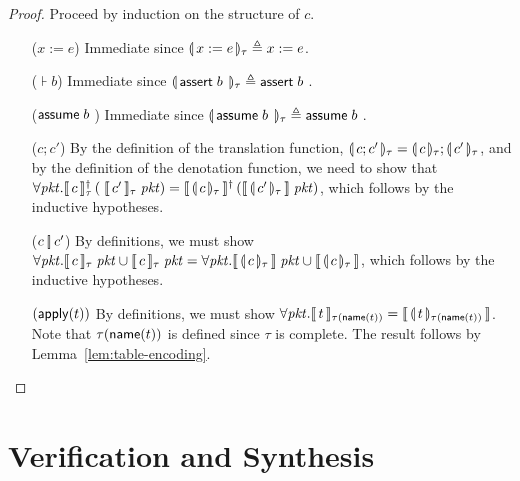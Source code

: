 \begin{proof}

  Proceed by induction on the structure of $c$.
  \begin{enumerate}[align=left]
  \item[($x:=e$)] Immediate since $\llparenthesis\, x:=e\, \rrparenthesis_{\tau} \triangleq x := e$.
  \item[($\assert b$)] Immediate since
    $\llparenthesis\, \mathsf{assert}\; b\;\, \rrparenthesis_{\tau} \triangleq \mathsf{assert}\; b\;$.
  \item[($\mathsf{assume}\; b\;$)] Immediate since $\llparenthesis\, \mathsf{assume}\; b\;\, \rrparenthesis_{\tau} \triangleq \mathsf{assume}\; b\;$.
  \item[($c;c'$)] By the definition of the translation function,
    $\llparenthesis\, c;c'\, \rrparenthesis_{\tau} = \llparenthesis\, c\, \rrparenthesis_{\tau};\llparenthesis\, c'\, \rrparenthesis_{\tau}$,
    and by the definition of the denotation function, we need to show
    that
    $\forall
    \mathit{pkt}. \llbracket\,c\,\rrbracket_\tau^\dag\left(\;\llbracket\,c'\,\rrbracket_\tau\;\mathit{pkt}\right) =
    \llbracket\,\llparenthesis\, c\, \rrparenthesis_\tau\,\rrbracket^\dag\left(\llbracket\,\llparenthesis\, c'\, \rrparenthesis_\tau\,\rrbracket\;\mathit{pkt}\right)$,
  which follows by the inductive hypotheses.
  \item[($c \operatorname*{\left[\!\right]} c'$)] By definitions, we must show
    $\forall \mathit{pkt}. \llbracket\,c\,\rrbracket_\tau\; \mathit{pkt} \cup \llbracket\,c\,\rrbracket_\tau\;
    \mathit{pkt} = \forall \mathit{pkt}. \llbracket\,\llparenthesis\, c\, \rrparenthesis_\tau\,\rrbracket\; \mathit{pkt} \cup
    \llbracket\,\llparenthesis\, c\, \rrparenthesis_\tau\,\rrbracket$, which follows by the inductive
    hypotheses.
  \item[$(\mathsf{apply}(t))$] By definitions, we must show
    $\forall \mathit{pkt}. \llbracket\,t\,\rrbracket_{\tau(\mathsf{name}(t))} =
    \llbracket\,\llparenthesis\, t\, \rrparenthesis_{\tau(\mathsf{name}(t))}\,\rrbracket$. Note that $\tau(\mathsf{name}(t))$
    is defined since $\tau$ is complete. The result follows by
    Lemma~\ref{lem:table-encoding}.
  \end{enumerate}
\end{proof}


\section{Verification and Synthesis}


